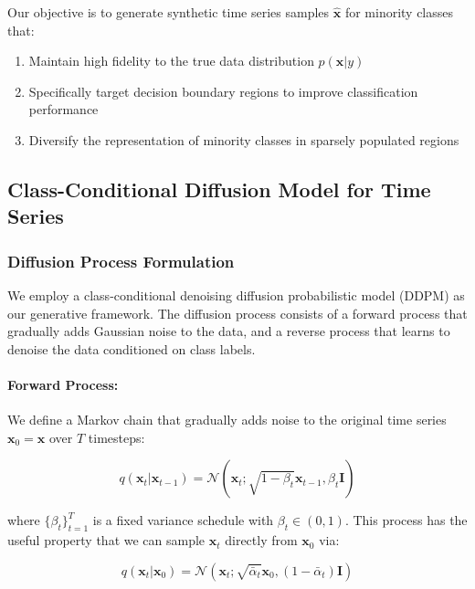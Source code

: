 \documentclass{article}
\begin{document}
Our objective is to generate synthetic time series samples $\hat{\mathbf{x}}$ for minority classes that:
\begin{enumerate}
    \item Maintain high fidelity to the true data distribution $p(\mathbf{x}|y)$
    \item Specifically target decision boundary regions to improve classification performance
    \item Diversify the representation of minority classes in sparsely populated regions
\end{enumerate}

\subsection{Class-Conditional Diffusion Model for Time Series}

\subsubsection{Diffusion Process Formulation}

We employ a class-conditional denoising diffusion probabilistic model (DDPM) as our generative framework. The diffusion process consists of a forward process that gradually adds Gaussian noise to the data, and a reverse process that learns to denoise the data conditioned on class labels.

\paragraph{Forward Process:} We define a Markov chain that gradually adds noise to the original time series $\mathbf{x}_0 = \mathbf{x}$ over $T$ timesteps:

\begin{equation}
q(\mathbf{x}_t | \mathbf{x}_{t-1}) = \mathcal{N}(\mathbf{x}_t; \sqrt{1 - \beta_t} \mathbf{x}_{t-1}, \beta_t \mathbf{I})
\end{equation}

where $\{\beta_t\}_{t=1}^T$ is a fixed variance schedule with $\beta_t \in (0, 1)$. This process has the useful property that we can sample $\mathbf{x}_t$ directly from $\mathbf{x}_0$ via:

\begin{equation}
q(\mathbf{x}_t | \mathbf{x}_0) = \mathcal{N}(\mathbf{x}_t; \sqrt{\bar{\alpha}_t} \mathbf{x}_0, (1 - \bar{\alpha}_t) \mathbf{I})
\end{equation}
\end{document}
